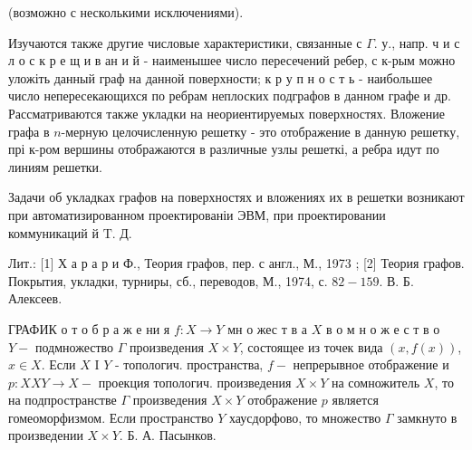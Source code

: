 \documentclass[10pt]{article}
\begin{document}
(возможно с несколькими исключениями).



Изучаются также другие числовые характеристики, связанные с $\Gamma$. у., напр. ч и с л о с к р е щ и в ан и й - наименышее число пересечений ребер, с к-рым можно уложіть данный граф на данной поверхности; к р у п н о с т ь - наибольшее число непересекающихся по ребрам неплоских подграфов в данном графе и др. Рассматриваются также укладки на неориентируемых поверхностях. Вложение графа в $n$-мерную целочисленную решетку - это отображение в данную решетку, прі к-ром вершины отображаются в различные узлы решеткі, а ребра идут по линиям решетки.



Задачи об укладках графов на поверхностях и вложениях их в решетки возникают при автоматизированном проектированіи ЭВМ, при проектировании коммуникаций й $\mathrm{T}$. Д.



Лит.: [1] Х а р а р и Ф., Теория графов, пер. с англ., М., 1973 ; [2] Теория графов. Покрытия, укладки, турниры, сб., переводов, М., 1974, с. $82-159$. В. Б. Алексеев.



ГРАФИК $о$ т о б р а ж е ни я $f: X \rightarrow Y$ мн о жес т в а $X$ в о м н о ж е с т в о $Y-$ подмножество $\Gamma$ произведения $X \times Y$, состоящее из точек вида $(x, f(x))$, $x \in X$. Если $X$ I $Y$ - топологич. пространства, $f-$ непрерывное отображение и $p: X X Y \rightarrow X-$ проекция топологич. произведения $X \times Y$ на сомножитель $X$, то на подпространстве $\Gamma$ произведения $X \times Y$ отображение $p$ является гомеоморфизмом. Если пространство $Y$ хаусдорфово, то множество $\Gamma$ замкнуто в произведении $X \times Y$. Б. А. Пасынков.
\end{document}
